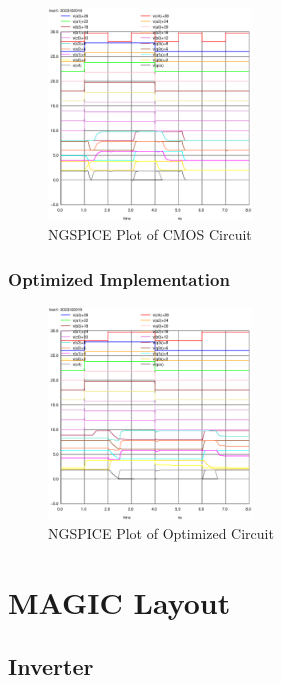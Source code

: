 \documentclass[conference]{IEEEtran}
\begin{document}
\begin{figure}[H]
    \centering
    \includegraphics[width=0.48\textwidth]{images/full_cmos_tran.eps}
    \caption{NGSPICE Plot of CMOS Circuit}
\end{figure}

\subsubsection{Optimized Implementation}

\begin{figure}[H]
    \centering
    \includegraphics[width=0.48\textwidth]{images/full_optimized_tran.eps}
    \caption{NGSPICE Plot of Optimized Circuit}
\end{figure}

\section{MAGIC Layout}

\subsection{Inverter}
\end{document}
